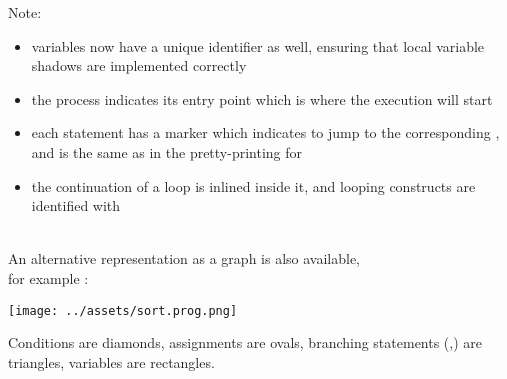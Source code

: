 

Note:
\begin{itemize}
    \item variables now have a unique identifier as well, ensuring that
        local variable shadows are implemented correctly
    \item the process indicates its entry point which is where the
        execution will start
    \item each statement has a \ttt{[n]} marker which indicates
        to jump to the corresponding , and  is the same
        as in the pretty-printing for 
    \item the continuation of a loop is inlined inside it, and looping
        constructs are identified with 
\end{itemize}~\\


An alternative representation as a graph is also available,\\
for example :

\begin{center}
\texttt{[image: ../assets/sort.prog.png]}
\end{center}
Conditions are diamonds, assignments are ovals, branching statements
(,) are triangles, variables are rectangles.

